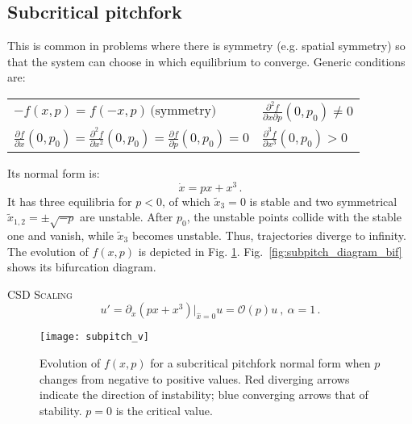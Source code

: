 \tocless\subsection{Subcritical pitchfork}
This is common in problems where there is symmetry (e.g. spatial symmetry) so that the system can choose in which equilibrium to converge. Generic conditions are:

\begin{table}[h!]
	\centering
	\begin{tabular}{ll}
		$ -f(x,p) = f(-x,p) \, \text{(symmetry)}$ & $\frac{\partial^2 f}{\partial x \partial p}(0,p_0)  \neq 0$   \\
		$\frac{\partial f}{\partial x}(0,p_0) = \frac{\partial^2 f}{\partial x^2}(0,p_0) =  \frac{\partial f}{\partial p}(0,p_0) = 0$ &   $\frac{\partial^3 f}{\partial x^3 }(0,p_0)  > 0$
	\end{tabular}
\end{table}

Its normal form is:
\begin{equation}
	\dot{x} = px + x^3 \, .
	\label{eq:subpitch}
\end{equation}
It has three equilibria for $p<0$, of which $\tilde{x}_3 =0$ is stable and two symmetrical $\tilde{x}_{1,2} = \pm \sqrt{-p}$ are unstable. After $p_0$, the unstable points collide with the stable one and vanish, while $\tilde{x}_3$ becomes unstable. Thus, trajectories diverge to infinity. The evolution of $f(x,p)$ is depicted in Fig. \ref{fig:subpitch_diagram}. Fig.~\ref{fig:subpitch_diagram_bif} shows its bifurcation diagram.

\textsc{CSD Scaling}
\begin{equation}
	u' = \partial_x(px+x^3)|_{\hat{x} = 0}u = \mathcal{O}(p) u \ , \ \alpha =1 \, .
\end{equation}


\begin{figure}[h!]
	\centering
	\texttt{[image: subpitch\_v]}
	\caption{\small Evolution of $f(x,p)$ for a subcritical pitchfork normal form when $p$ changes from negative to positive values. Red diverging arrows indicate the direction of instability; blue converging arrows that of stability. $p=0$ is the critical value. }
	\label{fig:subpitch_diagram}
\end{figure}

